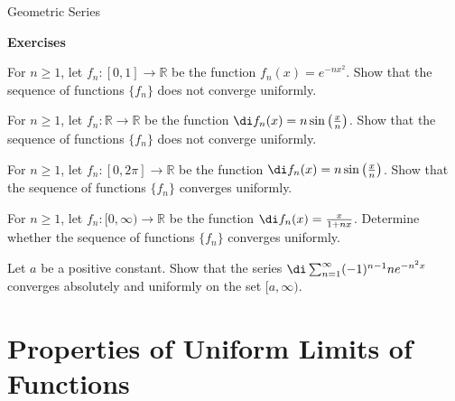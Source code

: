 \begin{example}[label=230305_16]{Geometric Series}
\begin{example}[label=230304_9]{}
\vp
\noindent
{\bf \large Exercises  \thesection}
\setcounter{myquestion}{1}
\begin{question}{\themyquestion}
For $n\geq 1$, let $f_n:[0,1]\to\mathbb{R}$ be the function $f_n(x)=e^{-nx^2}$.
Show that the sequence of functions $\{f_n \}$ does not converge uniformly. 
\end{question}
\atc
\begin{question}{\themyquestion}
For $n\geq 1$, let $f_n:\mathbb{R}\to\mathbb{R}$ be the function $\di f_n(x)=n\sin\left(\frac{x}{n}\right)$. Show that the sequence of functions $\{f_n \}$  does not converge uniformly. 
\end{question}

\atc
\begin{question}{\themyquestion}
For $n\geq 1$, let $f_n:[0,2\pi]\to\mathbb{R}$ be the function $\di f_n(x)=n\sin\left(\frac{x}{n}\right)$. Show that the sequence of functions $\{f_n \}$  converges uniformly. 
\end{question}
\atc
\begin{question}{\themyquestion}
For $n\geq 1$, let $f_n:[0,\infty)\to\mathbb{R}$ be the function $\di f_n(x)=\frac{x}{1+nx}$. Determine whether the sequence of functions $\{f_n \}$  converges uniformly. 
\end{question}
 
 \atc
\begin{question}{\themyquestion}
Let $a$ be a positive constant. Show that the series $\di\sum_{n=1}^{\infty}(-1)^{n-1}ne^{-n^2x}$ converges absolutely and uniformly on the set $[a, \infty)$.
\end{question}
\vp
\section{Properties of  Uniform Limits of Functions}\label{sec6.3}


\end{example}
\end{example}
